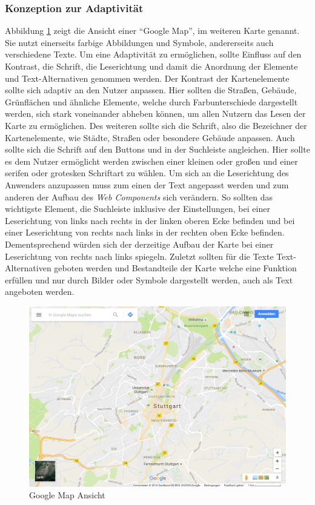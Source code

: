 \documentclass[12pt, paper=a4, bibtotoc, toc=listof, headsepline=true]{scrreprt}
\begin{document}
			\subsubsection{Konzeption zur Adaptivität}
			\label{ref:konVonAda}
			Abbildung \ref{img:gmap} zeigt die Ansicht einer \enquote{Google Map}, im weiteren Karte genannt. Sie nutzt einerseits farbige Abbildungen und Symbole, andererseits auch verschiedene Texte. Um eine Adaptivität zu ermöglichen, sollte Einfluss auf den Kontrast, die Schrift, die Leserichtung und damit die Anordnung der Elemente und Text-Alternativen genommen werden. Der Kontrast der Kartenelemente sollte sich adaptiv an den Nutzer anpassen. Hier sollten die Straßen, Gebäude, Grünflächen und ähnliche Elemente, welche durch Farbunterschiede dargestellt werden, sich stark voneinander abheben können, um allen Nutzern das Lesen der Karte zu ermöglichen. Des weiteren sollte sich die Schrift, also die Bezeichner der Kartenelemente, wie Städte, Straßen oder besondere Gebäude anpassen. Auch sollte sich die Schrift auf den Buttons und in der Suchleiste angleichen. Hier sollte es dem Nutzer ermöglicht werden zwischen einer kleinen oder großen und einer serifen oder grotesken Schriftart zu wählen. Um sich an die Leserichtung des Anwenders anzupassen muss zum einen der Text angepasst werden und zum anderen der Aufbau des \emph{Web Components} sich verändern. So sollten das wichtigste Element, die Suchleiste inklusive der Einstellungen, bei einer Leserichtung von links nach rechts in der linken oberen Ecke befinden und bei einer Leserichtung von rechts nach links in der rechten oben Ecke befinden. Dementsprechend würden sich der derzeitige Aufbau der Karte bei einer Leserichtung von rechts nach links spiegeln. Zuletzt sollten für die Texte Text-Alternativen geboten werden und Bestandteile der Karte welche eine Funktion erfüllen und nur durch Bilder oder Symbole dargestellt werden, auch als Text angeboten werden. 
			\begin{figure}
				\centering
				\includegraphics[width=\textwidth,height=\textheight,keepaspectratio]{gmap.png}
				\caption{Google Map Ansicht\cite{gooMapOri}}
				\label{img:gmap}
			\end{figure}
\end{document}
